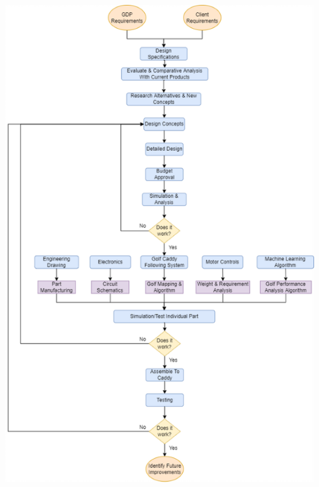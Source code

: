 \documentclass[11pt,landscape]{article}
\newenvironment{Figure}
  {\par\medskip\noindent\minipage{\linewidth}}
  {\endminipage\par\medskip}
\begin{document}
\begin{multicols}{3}
\begin{Figure} 
    \begin{center}
        \includegraphics[width=\textwidth]{design_process.png}
    \end{center}
    \label{fig:design_process}
\end{Figure}



\end{multicols}
\end{document}
